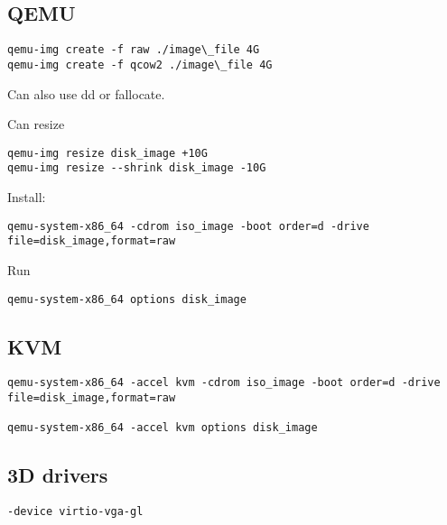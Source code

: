 
\subsection{QEMU}
\begin{verbatim}
qemu-img create -f raw ./image\_file 4G
qemu-img create -f qcow2 ./image\_file 4G
\end{verbatim}

Can also use dd or fallocate.

Can resize

\begin{verbatim}
qemu-img resize disk_image +10G
qemu-img resize --shrink disk_image -10G
\end{verbatim}

Install:

\begin{verbatim}
qemu-system-x86_64 -cdrom iso_image -boot order=d -drive file=disk_image,format=raw
\end{verbatim}

Run
\begin{verbatim}
qemu-system-x86_64 options disk_image
\end{verbatim}
\subsection{KVM}

\begin{verbatim}
qemu-system-x86_64 -accel kvm -cdrom iso_image -boot order=d -drive file=disk_image,format=raw

qemu-system-x86_64 -accel kvm options disk_image
\end{verbatim}


\subsection{3D drivers}

\begin{verbatim}
-device virtio-vga-gl

\end{verbatim}
